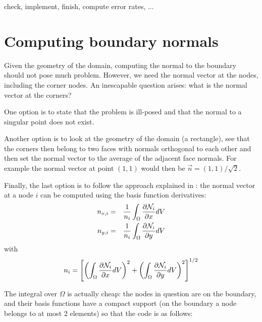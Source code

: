 {\color{red} check, implement, finish, compute error rates, ...}

\newpage
\section*{Computing boundary normals}

Given the geometry of the domain, computing the normal to the boundary 
should not pose much problem. However, we need the normal vector at the nodes,
including the corner nodes. An inescapable question arises: 
what is the normal vector at the corners?

One option is to state that the problem is ill-posed and that the normal to a
singular point does not exist.

Another option is to look at the geometry of the domain (a rectangle), see that 
the corners then belong to two faces with normals orthogonal to each other 
and then set the normal vector to the average of the adjacent face normals.
For example the normal vector at point $(1,1)$ would then be $\vec{n}=(1,1)/\sqrt{2}$.

Finally, the last option is to follow the approach 
explained in \textcite{ensg82}: 
the normal vector at a node $i$ can be computed using the basis function derivatives:
\begin{eqnarray}
n_{x,i} &=& \frac{1}{n_i}\int_\Omega \frac{\partial {\mathcal{N}}_i}{\partial x} dV \nonumber\\
n_{y,i} &=& \frac{1}{n_i}\int_\Omega \frac{\partial {\mathcal{N}}_i}{\partial y} dV \nonumber
\end{eqnarray}
with 
\[
n_i = \left[
\left(\int_\Omega \frac{\partial {\mathcal{N}}_i}{\partial x} dV\right)^2 +
\left(\int_\Omega \frac{\partial {\mathcal{N}}_i}{\partial y} dV\right)^2 
\right]^{1/2}
\]

The integral over $\Omega$ is actually cheap: the nodes in question are on the boundary, 
and their basis functions have a compact support (on the boundary a node belongs to at 
most 2 elements) so that the code is as follows:

